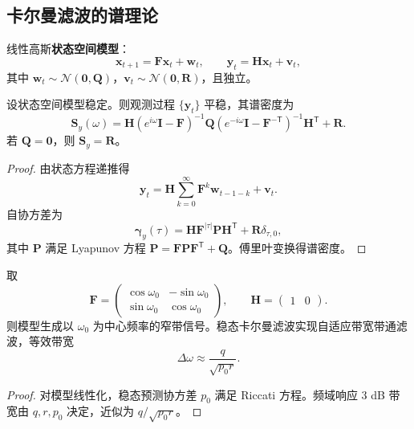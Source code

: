 \subsection{卡尔曼滤波的谱理论}

\begin{definition}[状态空间模型]\label{def:state_space_model}
线性高斯\textbf{状态空间模型}：
\[
\mathbf x_{t+1}=\mathbf F\mathbf x_t+\mathbf w_t,\qquad
\mathbf y_t=\mathbf H\mathbf x_t+\mathbf v_t,
\]
其中 $\mathbf w_t\sim\mathcal N(\mathbf 0,\mathbf Q)$，$\mathbf v_t\sim\mathcal N(\mathbf 0,\mathbf R)$，且独立。
\end{definition}

\begin{theorem}[状态空间模型的谱密度]\label{thm:kalman_spectrum}
设状态空间模型稳定。则观测过程 $\{\mathbf y_t\}$ 平稳，其谱密度为
\[
\mathbf S_y(\omega)=\mathbf H(e^{i\omega}\mathbf I-\mathbf F)^{-1}\mathbf Q(e^{-i\omega}\mathbf I-\mathbf F^{-\mathsf T})^{-1}\mathbf H^{\mathsf T}+\mathbf R.
\]
若 $\mathbf Q=\mathbf 0$，则 $\mathbf S_y=\mathbf R$。
\end{theorem}

\begin{proof}
由状态方程递推得
\[
\mathbf y_t=\mathbf H\sum_{k=0}^{\infty}\mathbf F^k\mathbf w_{t-1-k}+\mathbf v_t.
\]
自协方差为
\[
\boldsymbol\gamma_y(\tau)=\mathbf H\mathbf F^{|\tau|}\mathbf P\mathbf H^{\mathsf T}+\mathbf R\delta_{\tau,0},
\]
其中 $\mathbf P$ 满足 Lyapunov 方程 $\mathbf P=\mathbf F\mathbf P\mathbf F^{\mathsf T}+\mathbf Q$。傅里叶变换得谱密度。
\end{proof}

\begin{proposition}[卡尔曼滤波的周期信号提取]\label{prop:kalman_periodic_extraction}
取
\[
\mathbf F=\begin{pmatrix}\cos\omega_0&-\sin\omega_0\\ \sin\omega_0&\cos\omega_0\end{pmatrix},\qquad
\mathbf H=\begin{pmatrix}1&0\end{pmatrix}.
\]
则模型生成以 $\omega_0$ 为中心频率的窄带信号。稳态卡尔曼滤波实现自适应带宽带通滤波，等效带宽
\[
\Delta\omega\approx \frac{q}{\sqrt{p_0r}}.
\]
\end{proposition}

\begin{proof}
对模型线性化，稳态预测协方差 $p_0$ 满足 Riccati 方程。频域响应 $3$ dB 带宽由 $q,r,p_0$ 决定，近似为 $q/\sqrt{p_0r}$。
\end{proof}

